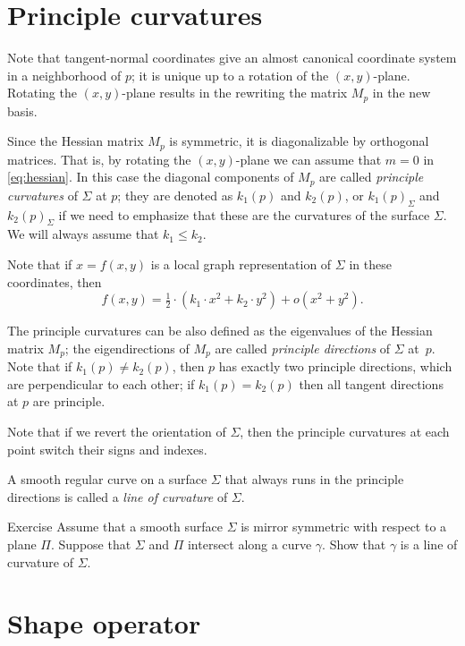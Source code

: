 \section*{Principle curvatures}

Note that tangent-normal coordinates give an almost canonical coordinate system in a neighborhood of $p$;
it is unique up to a rotation of  the $(x,y)$-plane.
Rotating the $(x,y)$-plane results in the rewriting   
the matrix $M_p$ in the new basis.

Since the Hessian matrix $M_p$ is symmetric, it is diagonalizable by orthogonal matrices.
That is, by rotating the $(x,y)$-plane we can assume that $m=0$ in \ref{eq:hessian}. %
In this case the diagonal components of $M_p$ are called \emph{principle curvatures} of $\Sigma$ at $p$;
they are denoted as $k_1(p)$ and $k_2(p)$, or $k_1(p)_\Sigma$ and $k_2(p)_\Sigma$ if we need to emphasize that these are the curvatures of the surface $\Sigma$.
We will always assume that $k_1\le k_2$.


Note that if $x=f(x,y)$ is a local graph representation of $\Sigma$ in these coordinates, then 
\[f(x,y)=\tfrac12\cdot(k_1\cdot x^2+k_2\cdot y^2)+o(x^2+y^2).\]

The principle curvatures can be also defined as the eigenvalues of the Hessian matrix $M_p$;
the eigendirections of $M_p$ are called \emph{principle directions} of $\Sigma$ at~$p$.
Note that if $k_1(p)\ne k_2(p)$, then $p$ has exactly two principle directions, which are perpendicular to each other; if $k_1(p)= k_2(p)$ then all tangent directions at $p$ are principle.

Note that if we revert the orientation of $\Sigma$, then the principle curvatures at each point switch their signs and indexes.

A smooth regular curve on a surface $\Sigma$ that always runs in the principle directions is called a \emph{line of curvature} of $\Sigma$.  

\begin{thm}{Exercise}\label{ex:line-of-curvature}
Assume that a smooth surface $\Sigma$ is mirror symmetric with respect to  a plane $\Pi$.
Suppose that $\Sigma$ and $\Pi$ intersect along a curve $\gamma$.
Show that $\gamma$ is a line of curvature of $\Sigma$.
\end{thm}

\section*{Shape operator}

